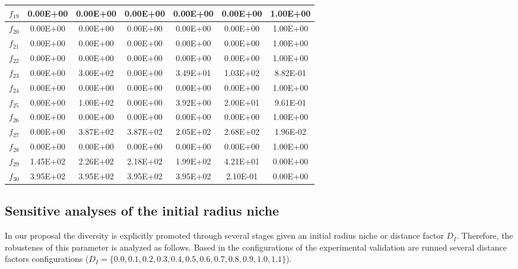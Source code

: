 \begin{table}[t]
{\begin{tabular}{|c|c|c|c|c|c|c|}
$f_{19}$ & 0.00E+00 & 0.00E+00 & 0.00E+00 & 0.00E+00 & 0.00E+00 & 1.00E+00 \\ \hline
$f_{20}$ & 0.00E+00 & 0.00E+00 & 0.00E+00 & 0.00E+00 & 0.00E+00 & 1.00E+00 \\ \hline
$f_{21}$ & 0.00E+00 & 0.00E+00 & 0.00E+00 & 0.00E+00 & 0.00E+00 & 1.00E+00 \\ \hline
$f_{22}$ & 0.00E+00 & 0.00E+00 & 0.00E+00 & 0.00E+00 & 0.00E+00 & 1.00E+00 \\ \hline
$f_{23}$ & 0.00E+00 & 3.00E+02 & 0.00E+00 & 3.49E+01 & 1.03E+02 & 8.82E-01 \\ \hline
$f_{24}$ & 0.00E+00 & 0.00E+00 & 0.00E+00 & 0.00E+00 & 0.00E+00 & 1.00E+00 \\ \hline
$f_{25}$ & 0.00E+00 & 1.00E+02 & 0.00E+00 & 3.92E+00 & 2.00E+01 & 9.61E-01 \\ \hline
$f_{26}$ & 0.00E+00 & 0.00E+00 & 0.00E+00 & 0.00E+00 & 0.00E+00 & 1.00E+00 \\ \hline
$f_{27}$ & 0.00E+00 & 3.87E+02 & 3.87E+02 & 2.05E+02 & 2.68E+02 & 1.96E-02 \\ \hline
$f_{28}$ & 0.00E+00 & 0.00E+00 & 0.00E+00 & 0.00E+00 & 0.00E+00 & 1.00E+00 \\ \hline
$f_{29}$ & 1.45E+02 & 2.26E+02 & 2.18E+02 & 1.99E+02 & 4.21E+01 & 0.00E+00 \\ \hline
$f_{30}$ & 3.95E+02 & 3.95E+02 & 3.95E+02 & 3.95E+02 & 2.10E-01 & 0.00E+00 \\ \hline
\end{tabular}%
}
\end{table}

\subsection{Sensitive analyses of the initial radius niche}

In our proposal the diversity is explicitly promoted through several stages given an initial radius niche or distance factor $D_I$.
%
Therefore, the robustenes of this parameter is analyzed as follows.
%
Based in the configurations of the experimental validation are runned several distance factors configurations ($D_I = \{0.0, 0.1, 0.2, 0.3, 0.4, 0.5, 0.6, 0.7, 0.8, 0.9, 1.0, 1.1 \}$).
%

